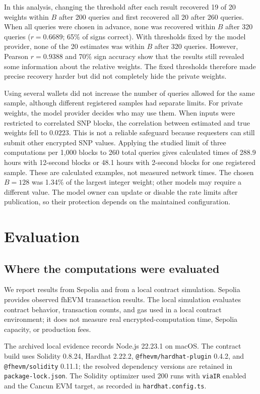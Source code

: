 \documentclass[10pt]{article}
\begin{document}
In this analysis, changing the threshold after each result recovered 19 of 20 weights
within $B$ after 200 queries and first recovered all 20 after 260 queries. When all
queries were chosen in advance, none was recovered within $B$ after 320 queries
($r=0.6689$; 65\% of signs correct). With thresholds fixed by the model provider, none
of the 20 estimates was within $B$ after 320 queries.  However, Pearson $r=0.9388$ and
70\% sign accuracy show that the results still revealed some information about the
relative weights.  The fixed thresholds therefore made precise recovery harder but did
not completely hide the private weights.

Using several wallets did not increase the number of queries allowed for the same
sample, although different registered samples had separate limits.  For private
weights, the model provider decides who may use them.  When inputs were restricted to
correlated SNP blocks, the correlation between estimated and true weights fell to
$0.0223$.  This is not a reliable safeguard because requesters can still submit other
encrypted SNP values. Applying the studied limit of three computations per 1,000 blocks
to 260 total queries gives calculated times of 288.9 hours with 12-second blocks or
48.1 hours with 2-second blocks for one registered sample. These are calculated examples,
not measured network times. The chosen $B=128$ was 1.34\% of the largest integer weight;
other models may require a different value.  The model owner can update or disable the
rate limits after publication, so their protection depends on the maintained configuration.

\section{Evaluation}
\label{sec:evaluation}

\subsection{Where the computations were evaluated}

We report results from Sepolia and from a local contract simulation.  Sepolia provides
observed fhEVM transaction results.  The local simulation evaluates contract behavior,
transaction counts, and gas used in a local contract environment; it does not measure
real encrypted-computation time, Sepolia capacity, or production fees.

The archived local evidence records Node.js 22.23.1 on macOS.  The contract build uses
Solidity 0.8.24, Hardhat 2.22.2, \texttt{@fhevm/hardhat-plugin} 0.4.2, and
\texttt{@fhevm/solidity} 0.11.1; the resolved dependency versions are retained in
\texttt{package-lock.json}.  The Solidity optimizer used 200 runs with \texttt{viaIR}
enabled and the Cancun EVM target, as recorded in \texttt{hardhat.config.ts}.
\end{document}

